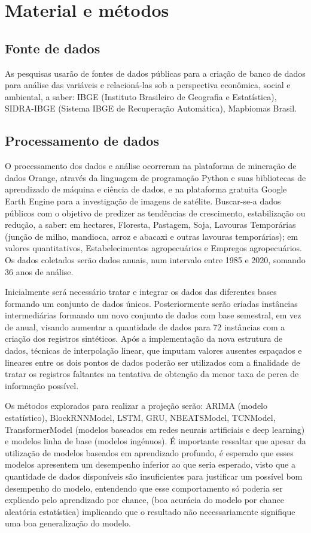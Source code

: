 

\section{Material e métodos}

\subsection{Fonte de dados}
As pesquisas usarão de fontes de dados públicas para a criação de banco de dados para análise das variáveis e relacioná-las sob a perspectiva
econômica, social e ambiental, a saber: IBGE (Instituto Brasileiro de Geografia e Estatística), SIDRA-IBGE (Sistema IBGE de Recuperação Automática), Mapbiomas Brasil.

\subsection{Processamento de dados}

O processamento dos dados e análise ocorreram na plataforma de mineração de dados Orange, através da linguagem de programação Python e suas
bibliotecas de aprendizado de máquina e ciência de dados, e na plataforma gratuita Google Earth Engine para a investigação de imagens de satélite.
Buscar-se-a dados públicos com o objetivo de predizer as tendências de crescimento, estabilização ou redução, a saber: em hectares, Floresta,
Pastagem, Soja, Lavouras Temporárias (junção de milho, mandioca, arroz e abacaxi e outras lavouras temporárias); em valores quantitativos,
Estabelecimentos agropecuários e Empregos agropecuários. Os dados coletados serão dados anuais, num intervalo entre 1985 e 2020, somando 36 anos
de análise.

Inicialmente será necessário tratar e integrar os dados das diferentes bases formando um conjunto de dados únicos. Posteriormente serão criadas
instâncias intermediárias formando um novo conjunto de dados com base semestral, em vez de anual, visando aumentar a quantidade de dados para 72 instâncias com a criação dos registros sintéticos. Após a implementação da nova estrutura de dados, técnicas de interpolação linear, que imputam valores ausentes espaçados e lineares entre os dois pontos de dados poderão ser utilizados com a finalidade de tratar os registros faltantes na tentativa de obtenção da menor taxa de perca de informação possível.

Os métodos explorados para realizar a projeção serão: ARIMA (modelo estatístico), BlockRNNModel, LSTM, GRU, NBEATSModel, TCNModel,
TransformerModel (modelos baseados em redes neurais artificiais e deep learning) e modelos linha de base (modelos ingénuos). É importante ressaltar que apesar da utilização de modelos baseados em aprendizado profundo, é esperado que esses modelos apresentem um desempenho inferior ao que seria esperado, visto que a quantidade de dados disponíveis são insuficientes para justificar um possível bom desempenho do modelo, entendendo que esse comportamento só poderia ser explicado pelo aprendizado por chance, (boa acurácia do modelo por chance aleatória estatística) implicando que o resultado não necessariamente signifique uma boa generalização do modelo. 


